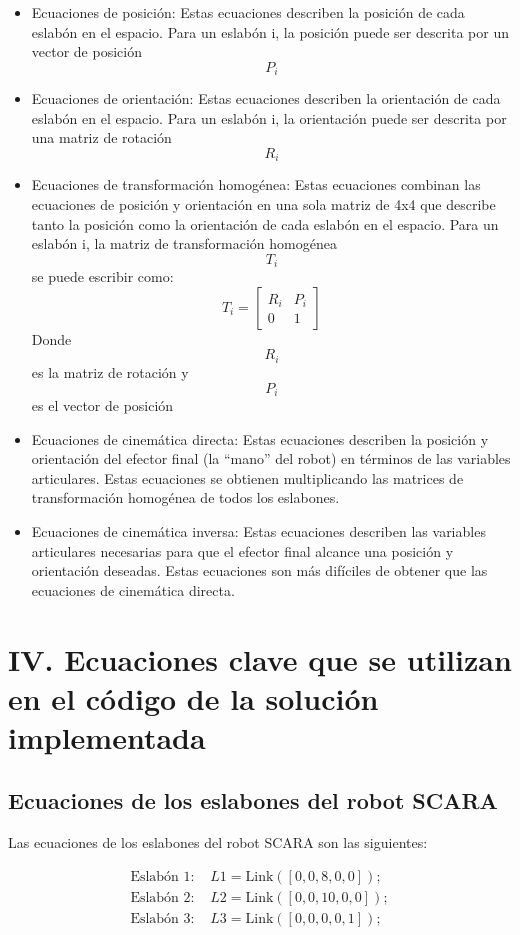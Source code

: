 \documentclass[final]{foresj}
\begin{document}
\begin{itemize}
\item Ecuaciones de posición: Estas ecuaciones describen la posición de cada eslabón en el espacio. Para un eslabón i, la posición puede ser descrita por un vector de posición $$P_i$$
\item Ecuaciones de orientación: Estas ecuaciones describen la orientación de cada eslabón en el espacio. Para un eslabón i, la orientación puede ser descrita por una matriz de rotación $$R_i$$
\item Ecuaciones de transformación homogénea: Estas ecuaciones combinan las ecuaciones de posición y orientación en una sola matriz de 4x4 que describe tanto la posición como la orientación de cada eslabón en el espacio. Para un eslabón i, la matriz de transformación homogénea $$T_i$$ se puede escribir como: $$T_i = \begin{bmatrix} R_i & P_i \\ 0 & 1 \end{bmatrix}$$ Donde $$R_i$$ es la matriz de rotación y $$P_i$$ es el vector de posición
\item Ecuaciones de cinemática directa: Estas ecuaciones describen la posición y orientación del efector final (la “mano” del robot) en términos de las variables articulares. Estas ecuaciones se obtienen multiplicando las matrices de transformación homogénea de todos los eslabones.
\item Ecuaciones de cinemática inversa: Estas ecuaciones describen las variables articulares necesarias para que el efector final alcance una posición y orientación deseadas. Estas ecuaciones son más difíciles de obtener que las ecuaciones de cinemática directa.
\end{itemize}

\section{IV. Ecuaciones clave que se utilizan en el código de la solución implementada}

\subsection{Ecuaciones de los eslabones del robot SCARA}

Las ecuaciones de los eslabones del robot SCARA son las siguientes:

\begin{align*}
\text{Eslabón 1: } & L1 = \text{Link}([0, 0, 8, 0, 0]); \\
\text{Eslabón 2: } & L2 = \text{Link}([0, 0, 10, 0, 0]); \\
\text{Eslabón 3: } & L3 = \text{Link}([0, 0, 0, 0, 1]);
\end{align*}
\end{document}
